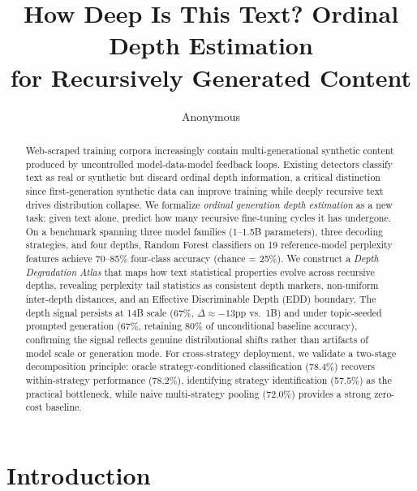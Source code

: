 \documentclass[11pt,a4paper]{article}
\title{How Deep Is This Text? Ordinal Depth Estimation\\for Recursively Generated Content}
\author{Anonymous}
\date{}
\newcommand{\pp}{\mathrm{pp}}
\begin{document}
\maketitle

\begin{abstract}
Web-scraped training corpora increasingly contain multi-generational synthetic content produced by uncontrolled model-data-model feedback loops. Existing detectors classify text as real or synthetic but discard ordinal depth information, a critical distinction since first-generation synthetic data can improve training while deeply recursive text drives distribution collapse. We formalize \emph{ordinal generation depth estimation} as a new task: given text alone, predict how many recursive fine-tuning cycles it has undergone. On a benchmark spanning three model families (1--1.5B parameters), three decoding strategies, and four depths, Random Forest classifiers on 19 reference-model perplexity features achieve 70--85\% four-class accuracy (chance = 25\%). We construct a \emph{Depth Degradation Atlas} that maps how text statistical properties evolve across recursive depths, revealing perplexity tail statistics as consistent depth markers, non-uniform inter-depth distances, and an Effective Discriminable Depth (EDD) boundary. The depth signal persists at 14B scale (67\%, $\Delta \approx -13\pp$ vs.\ 1B) and under topic-seeded prompted generation (67\%, retaining 80\% of unconditional baseline accuracy), confirming the signal reflects genuine distributional shifts rather than artifacts of model scale or generation mode. For cross-strategy deployment, we validate a two-stage decomposition principle: oracle strategy-conditioned classification (78.4\%) recovers within-strategy performance (78.2\%), identifying strategy identification (57.5\%) as the practical bottleneck, while naive multi-strategy pooling (72.0\%) provides a strong zero-cost baseline.
\end{abstract}

\section{Introduction}
\end{document}
